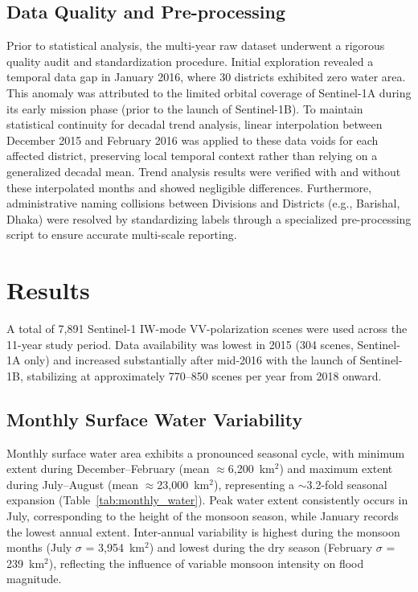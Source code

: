 \documentclass[fleqn,10pt]{article}
\begin{document}
\subsection{Data Quality and Pre-processing}
Prior to statistical analysis, the multi-year raw dataset underwent a rigorous quality audit and standardization procedure. Initial exploration revealed a temporal data gap in January 2016, where 30 districts exhibited zero water area. This anomaly was attributed to the limited orbital coverage of Sentinel-1A during its early mission phase (prior to the launch of Sentinel-1B). To maintain statistical continuity for decadal trend analysis, linear interpolation between December 2015 and February 2016 was applied to these data voids for each affected district, preserving local temporal context rather than relying on a generalized decadal mean. Trend analysis results were verified with and without these interpolated months and showed negligible differences. Furthermore, administrative naming collisions between Divisions and Districts (e.g., Barishal, Dhaka) were resolved by standardizing labels through a specialized pre-processing script to ensure accurate multi-scale reporting.


\section{Results}

A total of 7,891 Sentinel-1 IW-mode VV-polarization scenes were used across the 11-year study period. Data availability was lowest in 2015 (304 scenes, Sentinel-1A only) and increased substantially after mid-2016 with the launch of Sentinel-1B, stabilizing at approximately 770--850 scenes per year from 2018 onward.

\subsection{Monthly Surface Water Variability}

Monthly surface water area exhibits a pronounced seasonal cycle, with minimum extent during December--February (mean $\approx$6,200~km$^2$) and maximum extent during July--August (mean $\approx$23,000~km$^2$), representing a $\sim$3.2-fold seasonal expansion (Table~\ref{tab:monthly_water}). Peak water extent consistently occurs in July, corresponding to the height of the monsoon season, while January records the lowest annual extent. Inter-annual variability is highest during the monsoon months (July $\sigma$ = 3,954~km$^2$) and lowest during the dry season (February $\sigma$ = 239~km$^2$), reflecting the influence of variable monsoon intensity on flood magnitude.
\end{document}
